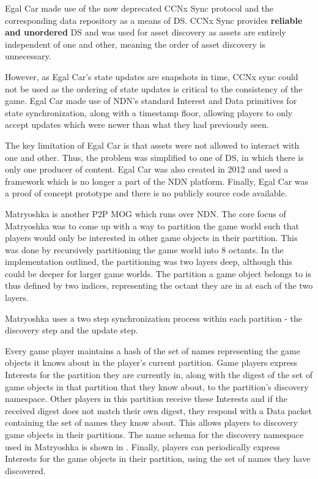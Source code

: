 Egal Car made use of the now deprecated CCNx Sync protocol \cite{ccnx-sync} and the corresponding data repository as a means of DS. CCNx Sync provides \textbf{reliable and unordered} DS and was used for asset discovery as assets are entirely independent of one and other, meaning the order of asset discovery is unnecessary.

However, as Egal Car's state updates are snapshots in time, CCNx sync could not be used as the ordering of state updates is critical to the consistency of the game. Egal Car made use of NDN's standard Interest and Data primitives for state synchronization, along with a timestamp floor, allowing players to only accept updates which were newer than what they had previously seen.

The key limitation of Egal Car is that assets were not allowed to interact with one and other. Thus, the problem was simplified to one of DS, in which there is only one producer of content. Egal Car was also created in 2012 and used a framework which is no longer a part of the NDN platform. Finally, Egal Car was a proof of concept prototype and there is no publicly source code available. 

\label{sec:sota:matryoshka}
Matryoshka is another P2P MOG which runs over NDN. The core focus of Matryoshka was to come up with a way to partition the game world such that players would only be interested in other game objects in their partition. This was done by recursively partitioning the game world into 8 octants. In the implementation outlined, the partitioning was two layers deep, although this could be deeper for larger game worlds. The partition a game object belongs to is thus defined by two indices, representing the octant they are in at each of the two layers. 

Matryoshka uses a two step synchronization process within each partition - the discovery step and the update step. 

Every game player maintains a hash of the set of names representing the game objects it knows about in the player's current partition. Game players express Interests for the partition they are currently in, along with the digest of the set of game objects in that partition that they know about, to the partition's discovery namespace. Other players in this partition receive these Interests and if the received digest does not match their own digest, they respond with a Data packet containing the set of names they know about. This allows players to discovery game objects in their partitions. The name schema for the discovery namespace used in Matryoshka is shown in . Finally, players can periodically express Interests for the game objects in their partition, using the set of names they have discovered. 

